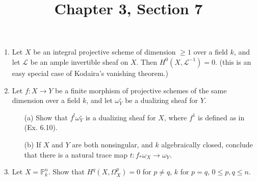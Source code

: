 \documentclass{article}
\title{Chapter 3, Section 7}
\newcommand{\PP}{\mathbb{P}}
\begin{document}
\maketitle
\begin{enumerate} [label=\textbf{\arabic*.}, leftmargin=0em]

\item Let $X$ be an integral projective scheme of dimension $\geq 1$ over a field $k$, and let $\mathscr{L}$ be an ample invertible sheaf on $X$. Then $H^0(X, \mathscr{L}^{-1}) = 0$. (this is an easy special case of Kodaira's vanishing theorem.)

\item Let $f : X \to Y$ be a finite morphism of projective schemes of the same dimension over a field $k$, and let $\omega_Y^\circ$ be a dualizing sheaf for $Y$.
\begin{itemize}
  \item[(a)] Show that $f^! \omega_Y^\circ$ is a dualizing sheaf for $X$, where $f^1$ is defined as in (Ex. 6.10).
  \item[(b)] If $X$ and $Y$ are both nonsingular, and $k$ algebraically closed, conclude that there is a natural trace map $t : f_* \omega_X \to \omega_Y$.
\end{itemize}

\item Let $X = \PP_k^n$. Show that $H^q(X, \Omega_X^p) = 0$ for $p \neq q$, $k$ for $p = q$, $0 \leq p, q \leq n$.


\end{enumerate}
\end{document}
